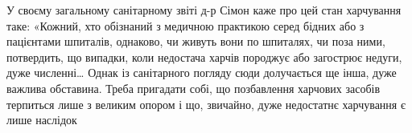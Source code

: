 У своєму загальному санітарному звіті д-р Сімон каже про
цей стан харчування таке: «Кожний, хто обізнаний з медичною
практикою серед бідних або з пацієнтами шпиталів, однаково,
чи живуть вони по шпиталях, чи поза ними, потвердить, що випадки,
коли недостача харчів породжує або загострює недуги,
дуже численні\dots{} Однак із санітарного погляду сюди долучається
ще інша, дуже важлива обставина. Треба пригадати собі, що
позбавлення харчових засобів терпиться лише з великим опором
і що, звичайно, дуже недостатнє харчування є лише наслідок
\parbreak{}  %
